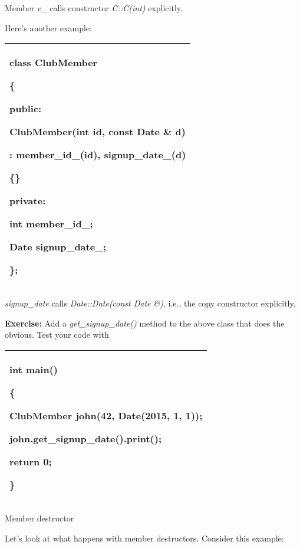 \documentclass[
]{article}
\begin{document}
Member \emph{c\_} calls constructor \emph{C::C(int)} explicitly.

Here's another example:

\begin{longtable}[]{@{}l@{}}
\toprule
\endhead
\begin{minipage}[t]{0.97\columnwidth}\raggedright
class ClubMember

\{

public:

ClubMember(int id, const Date \& d)

: member\_id\_(id), \textbf{signup\_date\_(d)}

\{\}

private:

int member\_id\_;

Date signup\_date\_;

\};\strut
\end{minipage}\tabularnewline
\bottomrule
\end{longtable}

\emph{signup\_date} calls \emph{Date::Date(const Date \&)}, i.e., the
copy constructor explicitly.

\textbf{Exercise:} Add a \emph{get\_signup\_date()} method to the above
class that does the obvious. Test your code with

\begin{longtable}[]{@{}l@{}}
\toprule
\endhead
\begin{minipage}[t]{0.97\columnwidth}\raggedright
int main()

\{

ClubMember john(42, Date(2015, 1, 1));

john.get\_signup\_date().print();

return 0;

\}\strut
\end{minipage}\tabularnewline
\bottomrule
\end{longtable}

Member destructor

Let's look at what happens with member destructors. Consider this
example:
\end{document}

